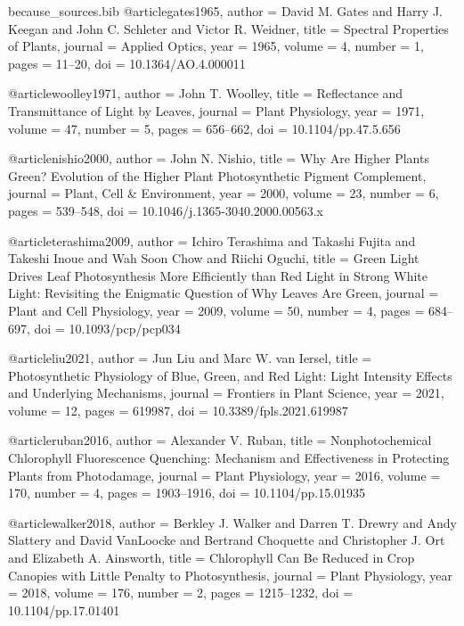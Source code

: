 \begin{filecontents*}{because_sources.bib}
@article{gates1965,
  author  = {David M. Gates and Harry J. Keegan and John C. Schleter and Victor R. Weidner},
  title   = {Spectral Properties of Plants},
  journal = {Applied Optics},
  year    = {1965},
  volume  = {4},
  number  = {1},
  pages   = {11--20},
  doi     = {10.1364/AO.4.000011}
}

@article{woolley1971,
  author  = {John T. Woolley},
  title   = {Reflectance and Transmittance of Light by Leaves},
  journal = {Plant Physiology},
  year    = {1971},
  volume  = {47},
  number  = {5},
  pages   = {656--662},
  doi     = {10.1104/pp.47.5.656}
}

@article{nishio2000,
  author  = {John N. Nishio},
  title   = {Why Are Higher Plants Green? Evolution of the Higher Plant Photosynthetic Pigment Complement},
  journal = {Plant, Cell \& Environment},
  year    = {2000},
  volume  = {23},
  number  = {6},
  pages   = {539--548},
  doi     = {10.1046/j.1365-3040.2000.00563.x}
}

@article{terashima2009,
  author  = {Ichiro Terashima and Takashi Fujita and Takeshi Inoue and Wah Soon Chow and Riichi Oguchi},
  title   = {Green Light Drives Leaf Photosynthesis More Efficiently than Red Light in Strong White Light: Revisiting the Enigmatic Question of Why Leaves Are Green},
  journal = {Plant and Cell Physiology},
  year    = {2009},
  volume  = {50},
  number  = {4},
  pages   = {684--697},
  doi     = {10.1093/pcp/pcp034}
}

@article{liu2021,
  author  = {Jun Liu and Marc W. van Iersel},
  title   = {Photosynthetic Physiology of Blue, Green, and Red Light: Light Intensity Effects and Underlying Mechanisms},
  journal = {Frontiers in Plant Science},
  year    = {2021},
  volume  = {12},
  pages   = {619987},
  doi     = {10.3389/fpls.2021.619987}
}

@article{ruban2016,
  author  = {Alexander V. Ruban},
  title   = {Nonphotochemical Chlorophyll Fluorescence Quenching: Mechanism and Effectiveness in Protecting Plants from Photodamage},
  journal = {Plant Physiology},
  year    = {2016},
  volume  = {170},
  number  = {4},
  pages   = {1903--1916},
  doi     = {10.1104/pp.15.01935}
}

@article{walker2018,
  author  = {Berkley J. Walker and Darren T. Drewry and Andy Slattery and David VanLoocke and Bertrand Choquette and Christopher J. Ort and Elizabeth A. Ainsworth},
  title   = {Chlorophyll Can Be Reduced in Crop Canopies with Little Penalty to Photosynthesis},
  journal = {Plant Physiology},
  year    = {2018},
  volume  = {176},
  number  = {2},
  pages   = {1215--1232},
  doi     = {10.1104/pp.17.01401}
}


\end{filecontents*}
